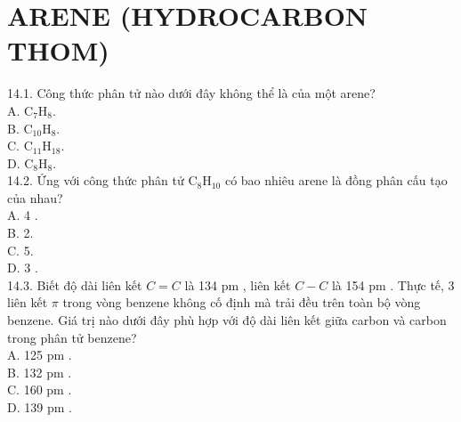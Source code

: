 \documentclass[10pt]{article}
\begin{document}
\section*{ARENE (HYDROCARBON THOM)}
14.1. Công thức phân tử nào dưới đây không thể là của một arene?\\
A. $\mathrm{C}_{7} \mathrm{H}_{8}$.\\
B. $\mathrm{C}_{10} \mathrm{H}_{8}$.\\
C. $\mathrm{C}_{11} \mathrm{H}_{18}$.\\
D. $\mathrm{C}_{8} \mathrm{H}_{8}$.\\
14.2. Ứng với công thức phân tử $\mathrm{C}_{8} \mathrm{H}_{10}$ có bao nhiêu arene là đồng phân cấu tạo của nhau?\\
A. 4 .\\
B. 2.\\
C. 5.\\
D. 3 .\\
14.3. Biết độ dài liên kết $C=C$ là 134 pm , liên kết $C-C$ là 154 pm . Thực tế, 3 liên kết $\pi$ trong vòng benzene không cố định mà trải đều trên toàn bộ vòng benzene. Giá trị nào dưới đây phù hợp với độ dài liên kết giữa carbon và carbon trong phân tử benzene?\\
A. 125 pm .\\
B. 132 pm .\\
C. 160 pm .\\
D. 139 pm .
\end{document}
